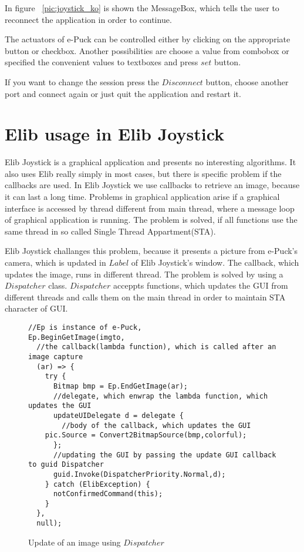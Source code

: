 	
	In figure ~\ref{pic:joystick_ko} is shown the MessageBox, which tells the user to reconnect the application
	in order to continue.

	The actuators of e-Puck can be controlled either by clicking on the appropriate button or checkbox. Another
	possibilities are choose a value from combobox or specified the  convenient values to textboxes and press
	$set$ button.

	If you want to change the session press the $Disconnect$ button, choose another port and connect again or
	just quit the application and restart it.

	\section{Elib usage in Elib Joystick}\label{sec:joystick_trick}
	Elib Joystick is a graphical application and presents no interesting algorithms. It also uses Elib
	really simply in most cases, but there is specific problem if the callbacks are used.
	In Elib Joystick we use callbacks to retrieve an image, because it can last a long time.
	Problems in graphical application arise if a graphical interface is accessed by thread different from
	main thread, where a message loop of graphical application is running. The problem is solved,
	if all functions use the same thread in so called Single Thread Appartment(STA).

	Elib Joystick challanges this problem, because it presents a picture from e-Puck's camera, which is updated
	in $Label$ of Elib Joystick's window. The callback, which updates the image, runs in different thread.
	The problem is solved by using a $Dispatcher$ class. $Dispatcher$ acceppts functions, which updates
	the GUI from different threads and calls them on the main thread in order to maintain STA character
	of GUI. 

\begin{figure}[!hbp]
\begin{lstlisting}
//Ep is instance of e-Puck,
Ep.BeginGetImage(imgto,
  //the callback(lambda function), which is called after an image capture
  (ar) => {
    try {
      Bitmap bmp = Ep.EndGetImage(ar);
      //delegate, which enwrap the lambda function, which updates the GUI
      updateUIDelegate d = delegate {
      	//body of the callback, which updates the GUI
	pic.Source = Convert2BitmapSource(bmp,colorful);
      };
      //updating the GUI by passing the update GUI callback to guid Dispatcher
      guid.Invoke(DispatcherPriority.Normal,d);
    } catch (ElibException) {
      notConfirmedCommand(this);
    }
  }, 
  null);
\end{lstlisting}
\caption{Update of an image using $Dispatcher$}
\label{updispatcher}
\end{figure}


